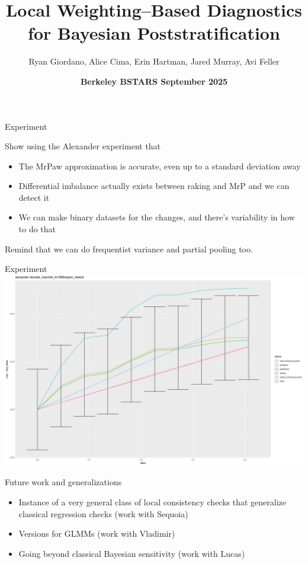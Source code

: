 \documentclass[8pt]{beamer}\usepackage[]{graphicx}\usepackage[]{color}
\title{Local Weighting--Based Diagnostics for Bayesian Poststratification}
\author{Ryan Giordano, Alice Cima, Erin Hartman, Jared Murray, Avi Feller}
\date{\textbf{Berkeley BSTARS September 2025}}
\begin{document}
\maketitle









\begin{frame}{Experiment}

Show using the Alexander experiment that
%
\begin{itemize}
    \item The MrPaw approximation is accurate, even up to a standard deviation away
    \item Differential imbalance actually exists between raking and MrP and we can detect it
    \item We can make binary datasets for the changes, and there's variability in how to do that
\end{itemize}
%
Remind that we can do frequentist variance and partial pooling too.

\end{frame}

\begin{frame}{Experiment}
\includegraphics[height=0.9\textheight]{static_figures/mrpaw.png}
\end{frame}



\begin{frame}{Future work and generalizations}
%
\begin{itemize}
    \item Instance of a very general class of local consistency checks that generalize
          classical regression checks (work with Sequoia)
    \item Versions for GLMMs (work with Vladimir)
    \item Going beyond classical Bayesian sensitivity (work with Lucas)
\end{itemize}
%
\end{frame}
\end{document}
